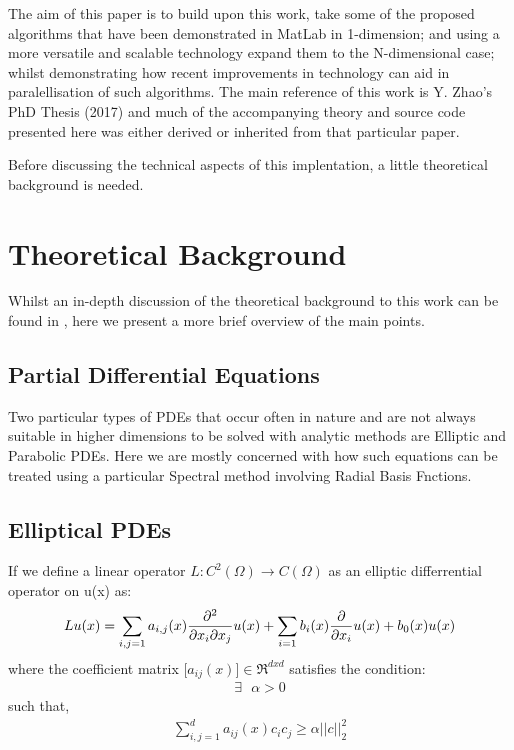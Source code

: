 \documentclass[a4paper]{amsart}
\begin{document}
The aim of this paper is to build upon this work, take some of the proposed algorithms that have been demonstrated in MatLab in 1-dimension; and using a more versatile and scalable technology expand them to the N-dimensional case; whilst demonstrating how recent improvements in technology can aid in paralellisation of such algorithms. The main reference of this work is Y. Zhao's PhD Thesis (2017) \cite{mski0} and much of the accompanying theory and source code presented here was either derived or inherited from that particular paper.

Before discussing the technical aspects of this implentation, a little theoretical background is needed.

\newpage

\section{Theoretical Background}
Whilst an in-depth discussion of the theoretical background to this work can be found in \cite{mski0}, here we present a more brief overview of the main points.

\subsection{Partial Differential Equations}
Two particular types of PDEs that occur often in nature and are not always suitable in higher dimensions to be solved with analytic methods are Elliptic and Parabolic PDEs. Here we are mostly concerned with how such equations can be treated using a particular Spectral method involving Radial Basis Fnctions.

\subsection{Elliptical PDEs} \label{EPDE}
If we define a linear operator $L : C^{2} (\Omega) \rightarrow C(\Omega)$ as an elliptic differrential operator on u(x) as:
\begin{equation}
Lu(x) = \sum_{i,j=1} a_{i,j}(x) \pdv{}{x_i}{x_j} u(x) + \sum_{i=1} b_{i}(x) \pdv{}{x_i} u(x) + b_{0}(x) u(x)
\label{EPDE}
\end{equation}
where the coefficient matrix $\big[ a_{ij}(x) \big] \in \Re^{dxd}$ satisfies the condition:
\begin{align*}
\exists \mbox{  } \alpha > 0
\end{align*}
 such that,
\begin{align*}
\sum_{i,j=1}^{d} a_{ij}(x)c_{i}c_{j}\geq \alpha||c||_{2}^{2}
\end{align*}
\end{document}
